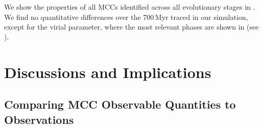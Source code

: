 \IfFileExists{emulateapjlegacy.cls}{\documentclass[iop]{emulateapjlegacy}}{\documentclass[iop]{emulateapj}}
\begin{document}


We show the properties of all MCCs identified across all evolutionary stages in .
We find no quantitative differences over the 700\,Myr traced in our simulation, except
for the virial parameter, where the most relevant phases are shown in  (see ).



\section{Discussions and Implications}\label{sec:diss}


\subsection{Comparing MCC Observable Quantities to Observations} \label{sec:diss1}
\end{document}
